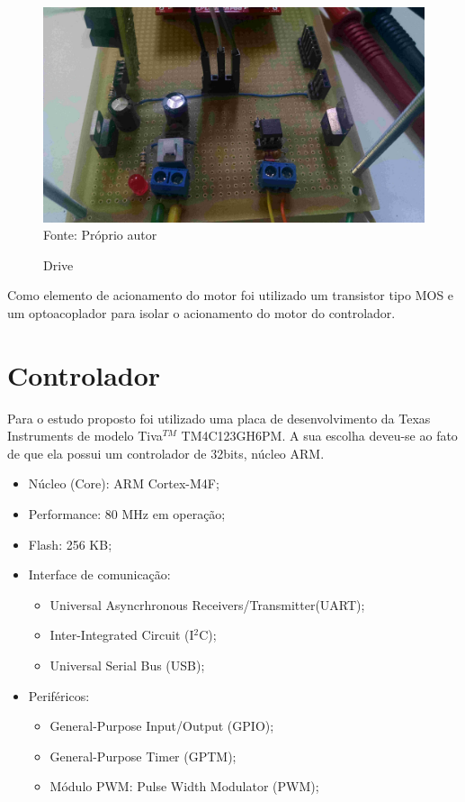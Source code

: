 \begin{figure}[!htb]
\caption{Drive}
\center\includegraphics[scale=0.1, angle=0, clip=true, trim=0 0 0 0]{./imagens/drive.jpg}
\label{fig:drive}
{ \small Fonte: Próprio autor}
\end{figure}

Como elemento de acionamento do motor foi utilizado um transistor tipo MOS 
%
e um optoacoplador para isolar o acionamento do motor do controlador.

\section{Controlador}

Para o estudo proposto foi utilizado uma placa de desenvolvimento da Texas Instruments de modelo Tiva$^{TM}$ TM4C123GH6PM. A sua escolha deveu-se ao fato de que ela possui um controlador de 32bits, núcleo ARM.

\begin{itemize}
\item Núcleo (Core): ARM Cortex-M4F;
\item Performance: 80 MHz em operação;
\item Flash: 256 KB;
\item Interface de comunicação:
	\begin{itemize}
	\item  Universal Asyncrhronous Receivers/Transmitter(UART);
  	\item Inter-Integrated Circuit (I$^2$C);
	\item Universal Serial Bus (USB);
	\end{itemize}
\item Periféricos:
	\begin{itemize}
	\item General-Purpose Input/Output (GPIO);
	\item General-Purpose Timer (GPTM);
	\item Módulo PWM: Pulse Width Modulator (PWM);
	\end{itemize}
\end{itemize}


